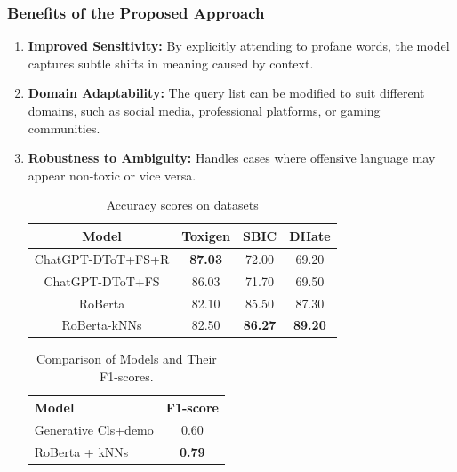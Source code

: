 \subsubsection{Benefits of the Proposed Approach}
\begin{enumerate}
    \item \textbf{Improved Sensitivity:} By explicitly attending to profane words, the model captures subtle shifts in meaning caused by context.
    \item \textbf{Domain Adaptability:} The query list can be modified to suit different domains, such as social media, professional platforms, or gaming communities.
    \item \textbf{Robustness to Ambiguity:} Handles cases where offensive language may appear non-toxic or vice versa.

    \begin{table}[!ht]
    \centering
    \begin{tabular}{c|c|c|c}
        \hline
        \textbf{Model} & \textbf{Toxigen} & \textbf{SBIC} & \textbf{DHate} \\
        \hline
        ChatGPT-DToT+FS+R & \textbf{87.03} & 72.00 & 69.20 \\
        ChatGPT-DToT+FS & 86.03 & 71.70 & 69.50 \\
        \hline
        RoBerta & 82.10 & 85.50 & 87.30 \\
        RoBerta-kNNs & 82.50 & \textbf{86.27} & \textbf{89.20} \\
         \hline
    \end{tabular}
    \caption{Accuracy scores on datasets}
    \label{tab:my_label}
    \end{table}

    \begin{table}[h!]
    \centering
    \begin{tabular}{l c}
    \toprule
    \textbf{Model} & \textbf{F1-score} \\
    \midrule
    Generative Cls+demo & 0.60 \\
    RoBerta + kNNs & \textbf{0.79} \\
    \bottomrule
    \end{tabular}
    \caption{Comparison of Models and Their F1-scores.}
    \label{tab:model_f1}
    \end{table}
    
\end{enumerate}

